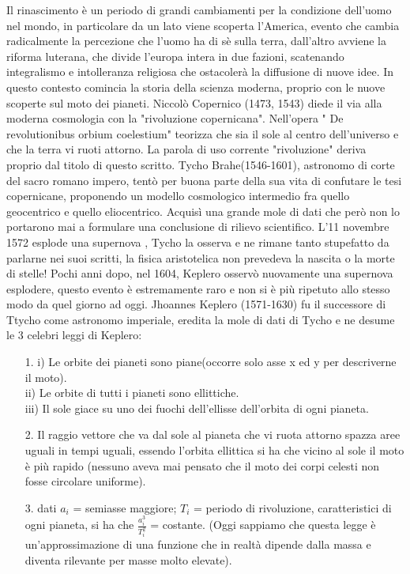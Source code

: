 \documentclass[10pt,a4paper]{article}
\begin{document}
Il rinascimento è un periodo di grandi cambiamenti per la condizione dell'uomo nel mondo, in particolare da un lato viene scoperta l'America, evento che cambia radicalmente la percezione che l'uomo ha di sè sulla terra, dall'altro avviene la riforma luterana, che divide l'europa intera in due fazioni, scatenando integralismo e intolleranza religiosa che ostacolerà la diffusione di nuove idee. In questo contesto comincia la storia della scienza moderna, proprio con le nuove scoperte sul moto dei pianeti. Niccolò Copernico (1473, 1543) diede il via alla moderna cosmologia con la "rivoluzione copernicana". Nell'opera " De revolutionibus orbium coelestium" teorizza che sia il sole al centro dell'universo e che la terra vi ruoti attorno. La parola di uso corrente "rivoluzione" deriva proprio dal titolo di questo scritto. Tycho Brahe(1546-1601), astronomo di corte del sacro romano impero, tentò per buona parte della sua vita di confutare le tesi copernicane, proponendo un modello cosmologico intermedio fra quello geocentrico e quello eliocentrico. Acquisì una grande mole di dati che però non lo portarono mai a formulare una conclusione di rilievo scientifico. L'11 novembre 1572 esplode una supernova , Tycho la osserva e ne rimane tanto stupefatto da parlarne nei suoi scritti, la fisica aristotelica non prevedeva la nascita o la morte di stelle! Pochi anni dopo, nel 1604, Keplero osservò nuovamente una supernova esplodere, questo evento è estremamente raro e non si è più ripetuto allo stesso modo da quel giorno ad oggi. Jhoannes Keplero (1571-1630) fu il successore di Ttycho come astronomo imperiale, eredita la mole di dati di Tycho e ne desume le 3 celebri leggi di Keplero:
\begin{itemize}
\item[1.] i) Le orbite dei pianeti sono piane(occorre solo asse x ed y per descriverne il moto). \\
ii) Le orbite di tutti i pianeti sono ellittiche.\\
iii) Il sole giace su uno dei fuochi dell'ellisse dell'orbita di ogni pianeta. 
\item[2.]Il raggio vettore che va dal sole al pianeta che vi ruota attorno spazza aree uguali in tempi uguali, essendo l'orbita ellittica si ha che vicino al sole il moto è più rapido (nessuno aveva mai pensato che il moto dei corpi celesti non fosse circolare uniforme). 
\item[3.] dati $a_i$ = semiasse maggiore; $T_i$ = periodo di rivoluzione, caratteristici di ogni pianeta, si ha che $\frac{a_i^3}{T_i^2}$ = costante. (Oggi sappiamo che questa legge è un'approssimazione di una funzione che in realtà dipende dalla massa e diventa rilevante per masse molto elevate).
\end{itemize}
\end{document}

